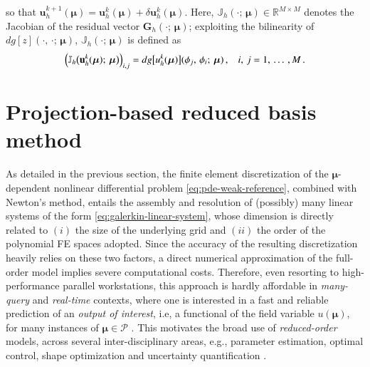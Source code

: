 \documentclass{elsarticle}
\theoremstyle{theorem}
\theoremstyle{definition}
\theoremstyle{remark}
\theoremstyle{proposition}
\numberwithin{figure}{section}
\newcommand{\bg}[1]{\boldsymbol{#1}}
\begin{document}
		so that $\mathbf{u}^{k+1}_h(\bg{\mu}) = \mathbf{u}^k_h(\bg{\mu}) + \delta \mathbf{u}^k_h(\bg{\mu})$. Here, $\mathbb{J}_h(\cdot; \, \bg{\mu}) \in \mathbb{R}^{M \times M}$ denotes the Jacobian of the residual vector $\mathbf{G}_h(\cdot; \, \bg{\mu})$; exploiting the bilinearity of $dg[z](\cdot, \, \cdot; \, \bg{\mu})$, $\mathbb{J}_h(\cdot; \, \bg{\mu})$ is defined as
		\begin{equation*}
			\left( \mathbb{J}_h \big( \mathbf{u}^k_h(\bg{\mu}); \, \bg{\mu} \big) \right)_{i,j} = dg\big[u^k_h(\bg{\mu})\big](\phi_j, \, \phi_i; \, \bg{\mu}) \, , \hspace*{0.3cm} i, \, j = 1, \, \ldots \, , M \, .
		\end{equation*} 
		
		
	
	\section{Projection-based reduced basis method}
	\label{section:Projection-based reduced basis method}
	
		As detailed in the previous section, the finite element discretization of the $\bg{\mu}$-dependent nonlinear differential problem \eqref{eq:pde-weak-reference}, combined with Newton's method, entails the assembly and resolution of (possibly) many linear systems of the form \eqref{eq:galerkin-linear-system}, whose dimension is directly related to $(i)$ the size of the underlying grid and $(ii)$ the order of the polynomial FE spaces adopted. Since the accuracy of the resulting discretization heavily relies on these two factors, a direct numerical approximation of the full-order model implies severe computational costs. Therefore, even resorting to high-performance parallel workstations, this approach is hardly affordable in \emph{many-query} and \emph{real-time} contexts, where one is interested in a fast and reliable prediction of an \emph{output of interest}, i.e, a functional of the field variable $u(\bg{\mu})$, for many instances of $\bg{\mu} \in \mathcal{P}$ \cite{Dep08}. This motivates the broad use of \emph{reduced-order} models, across several inter-disciplinary areas, e.g., parameter estimation, optimal control, shape optimization and uncertainty quantification \cite{HSR16, QMN15}. 
		
\end{document}
